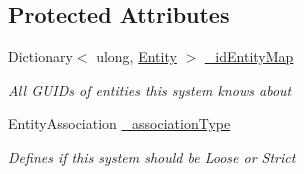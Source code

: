 \subsection*{Protected Attributes}
\begin{DoxyCompactItemize}
\item 
Dictionary$<$ ulong, \hyperlink{class_m_b2_d_1_1_entity_component_1_1_entity}{Entity} $>$ \hyperlink{class_m_b2_d_1_1_entity_component_1_1_entity_system_a7415c4bff1132bb4dadcc1a072c663da}{\+\_\+id\+Entity\+Map}
\begin{DoxyCompactList}\small\item\em All G\+U\+ID\textquotesingle{}s of entities this system knows about \end{DoxyCompactList}\item 
Entity\+Association \hyperlink{class_m_b2_d_1_1_entity_component_1_1_entity_system_a1e5512e27d2cf3f40dcf8f39975ca1d7}{\+\_\+association\+Type}
\begin{DoxyCompactList}\small\item\em Defines if this system should be Loose or Strict \end{DoxyCompactList}\end{DoxyCompactItemize}
